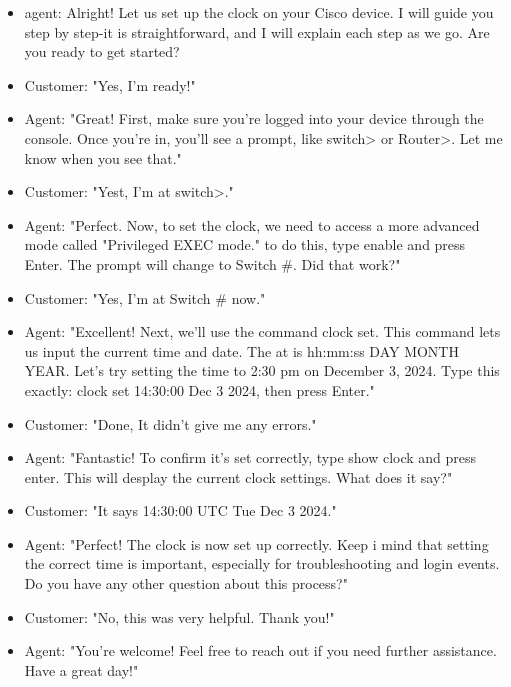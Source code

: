 \documentclass[a4paper,11pt]{article}
\begin{document}
\begin{tcolorbox}[colframe=blue!80, colback=blue!20, coltitle=black, title= Scenario: set up the clock]
\begin{itemize}
    \item agent: Alright! Let us set up the clock on your Cisco device. I will guide you step by step-it is straightforward, and I will explain each step as we go. Are you ready to get started?\\
    \item Customer: "Yes, I'm ready!"\\
    \item Agent: "Great! First, make sure you're logged into your device through the console. Once you're in, you'll see a prompt, like switch> or Router>. Let me know when you see that."\\
    \item Customer: "Yest, I'm at switch>."\\
    \item Agent: "Perfect. Now, to set the clock, we need to access a more advanced mode called "Privileged EXEC mode." to do this, type enable and press Enter. The prompt will change to Switch \#. Did that work?"\\
    \item Customer: "Yes, I'm at Switch \# now."\\
    \item Agent: "Excellent! Next, we'll use the command clock set. This command lets us input the current time and date. The at is hh:mm:ss DAY  MONTH YEAR. Let's try setting the time to 2:30 pm on December 3, 2024. Type this exactly: clock set 14:30:00 Dec 3 2024, then press Enter."\\
    \item Customer: "Done, It didn't  give me any errors."\\
    \item Agent: "Fantastic! To confirm it's set correctly, type show clock and press enter. This will desplay the current clock settings. What does it say?"\\
    \item Customer: "It says 14:30:00 UTC Tue Dec 3 2024."\\
    \item Agent: "Perfect! The clock is now set up correctly. Keep i mind that setting the correct time is important, especially for troubleshooting and login events. Do you have any other question about this process?"\\
    \item Customer: "No, this was very helpful. Thank you!"\\
    \item Agent: "You're welcome! Feel free to reach out if you need further assistance. Have a great day!"\\
    \end{itemize}
\end{tcolorbox}
\end{document}
